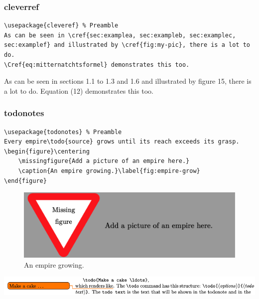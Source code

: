 \documentclass{beamer}
\begin{document}
\begin{frame}[fragile]
    \frametitle{cleverref}
    \begin{lstlisting}
\usepackage{cleveref} % Preamble
As can be seen in \cref{sec:examplea, sec:exampleb, sec:examplec, sec:examplef} and illustrated by \cref{fig:my-pic}, there is a lot to do.
\Cref{eq:mitternatchtsformel} demonstrates this too.
    \end{lstlisting}

    As can be seen in sections 1.1 to 1.3 and 1.6 and illustrated by figure 15, there is a lot to do.
    Equation (12) demonstrates this too.
\end{frame}

\begin{frame}[fragile]
    \frametitle{todonotes}
    \begin{lstlisting}[basicstyle=\ttfamily\footnotesize]
\usepackage{todonotes} % Preamble
Every empire\todo{source} grows until its reach exceeds its grasp.
\begin{figure}\centering
    \missingfigure{Add a picture of an empire here.}
    \caption{An empire growing.}\label{fig:empire-grow}
\end{figure}
    \end{lstlisting}

    \begin{figure}
        \centering\small
        \includegraphics[width=\linewidth]{images/missfig.png}
        \caption{An empire growing.}
        \label{fig:empire-grow}
    \end{figure}

    \includegraphics[width=\linewidth]{images/todo}
\end{frame}
\end{document}
